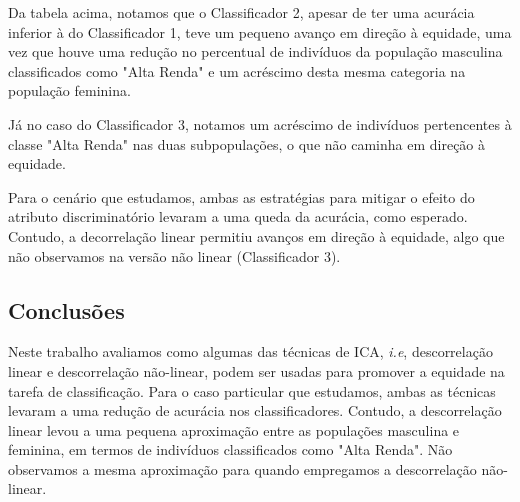 \documentclass[11pt]{article}
\begin{document}
    
    Da tabela acima, notamos que o Classificador 2, apesar de ter uma
acurácia inferior à do Classificador 1, teve um pequeno avanço em
direção à equidade, uma vez que houve uma redução no percentual de
indivíduos da população masculina classificados como "Alta Renda" e um
acréscimo desta mesma categoria na população feminina.

Já no caso do Classificador 3, notamos um acréscimo de indivíduos
pertencentes à classe "Alta Renda" nas duas subpopulações, o que não
caminha em direção à equidade.

Para o cenário que estudamos, ambas as estratégias para mitigar o efeito
do atributo discriminatório levaram a uma queda da acurácia, como
esperado. Contudo, a decorrelação linear permitiu avanços em direção à
equidade, algo que não observamos na versão não linear (Classificador
3).

    \subsection{Conclusões}\label{conclusuxf5es}

Neste trabalho avaliamos como algumas das técnicas de ICA, \emph{i.e},
descorrelação linear e descorrelação não-linear, podem ser usadas para
promover a equidade na tarefa de classificação. Para o caso particular
que estudamos, ambas as técnicas levaram a uma redução de acurácia nos
classificadores. Contudo, a descorrelação linear levou a uma pequena
aproximação entre as populações masculina e feminina, em termos de
indivíduos classificados como "Alta Renda". Não observamos a mesma
aproximação para quando empregamos a descorrelação não-linear.


    
    
    
    
\end{document}
